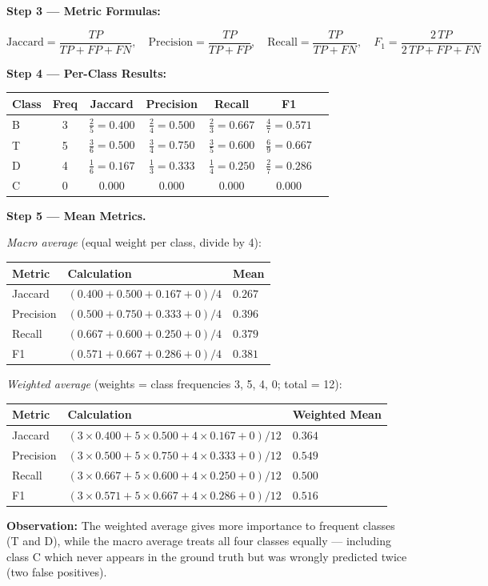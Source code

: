 \documentclass[12pt,a4paper]{article}
\begin{document}
\medskip
\textbf{Step 3 — Metric Formulas:}

\[
\text{Jaccard} = \frac{TP}{TP+FP+FN}, \quad
\text{Precision} = \frac{TP}{TP+FP}, \quad
\text{Recall} = \frac{TP}{TP+FN}, \quad
F_1 = \frac{2\,TP}{2\,TP+FP+FN}
\]

\medskip
\textbf{Step 4 — Per-Class Results:}

\begin{center}
\renewcommand{\arraystretch}{1.4}
\begin{tabular}{lcccccc}
\toprule
Class & Freq & Jaccard & Precision & Recall & F1 \\
\midrule
B & 3 & $\tfrac{2}{5} = 0.400$ & $\tfrac{2}{4} = 0.500$ & $\tfrac{2}{3} = 0.667$ & $\tfrac{4}{7} = 0.571$ \\
T & 5 & $\tfrac{3}{6} = 0.500$ & $\tfrac{3}{4} = 0.750$ & $\tfrac{3}{5} = 0.600$ & $\tfrac{6}{9} = 0.667$ \\
D & 4 & $\tfrac{1}{6} = 0.167$ & $\tfrac{1}{3} = 0.333$ & $\tfrac{1}{4} = 0.250$ & $\tfrac{2}{7} = 0.286$ \\
C & 0 & $0.000$ & $0.000$ & $0.000$ & $0.000$ \\
\bottomrule
\end{tabular}
\end{center}

\medskip
\textbf{Step 5 — Mean Metrics.}

\textit{Macro average} (equal weight per class, divide by 4):

\begin{center}
\renewcommand{\arraystretch}{1.3}
\begin{tabular}{lll}
\toprule
Metric & Calculation & Mean \\
\midrule
Jaccard   & $(0.400 + 0.500 + 0.167 + 0) / 4$ & $0.267$ \\
Precision & $(0.500 + 0.750 + 0.333 + 0) / 4$ & $0.396$ \\
Recall    & $(0.667 + 0.600 + 0.250 + 0) / 4$ & $0.379$ \\
F1        & $(0.571 + 0.667 + 0.286 + 0) / 4$ & $0.381$ \\
\bottomrule
\end{tabular}
\end{center}

\textit{Weighted average} (weights = class frequencies 3, 5, 4, 0; total = 12):

\begin{center}
\renewcommand{\arraystretch}{1.3}
\begin{tabular}{lll}
\toprule
Metric & Calculation & Weighted Mean \\
\midrule
Jaccard   & $(3{\times}0.400 + 5{\times}0.500 + 4{\times}0.167 + 0) / 12$ & $0.364$ \\
Precision & $(3{\times}0.500 + 5{\times}0.750 + 4{\times}0.333 + 0) / 12$ & $0.549$ \\
Recall    & $(3{\times}0.667 + 5{\times}0.600 + 4{\times}0.250 + 0) / 12$ & $0.500$ \\
F1        & $(3{\times}0.571 + 5{\times}0.667 + 4{\times}0.286 + 0) / 12$ & $0.516$ \\
\bottomrule
\end{tabular}
\end{center}

\medskip
\textbf{Observation:}  The weighted average gives more importance to frequent
classes (T and D), while the macro average treats all four classes equally —
including class C which never appears in the ground truth but was wrongly
predicted twice (two false positives).
\end{document}
